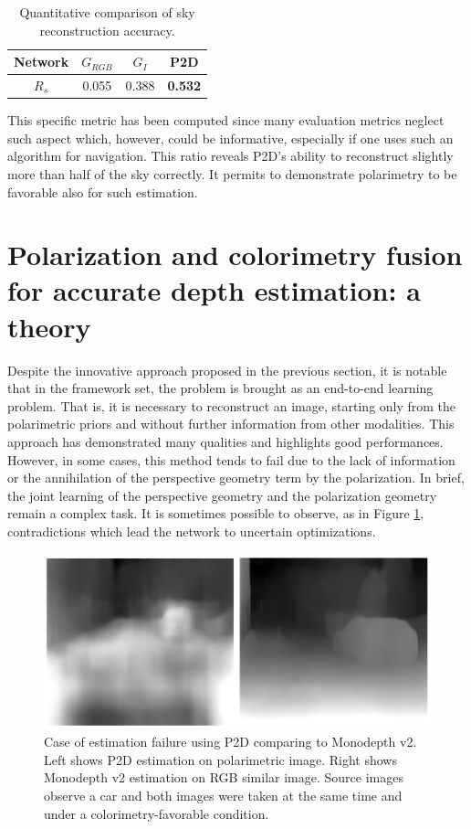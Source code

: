 \begin{center}
	\begin{table}[H]
		\centering
		\caption{Quantitative comparison of sky reconstruction accuracy.}
		\label{Reconsky}
		\begin{tabular}{c||ccc}
			\hline
			Network & $G_{RGB}$ & $G_{I}$ & P2D   \\ \hline \hline
			$R_s$      & 0.055     & 0.388   & \textbf{0.532} \\ \hline
		\end{tabular}
	\end{table}
\end{center}
This specific metric has been computed since many evaluation metrics neglect such aspect which, however, could be informative, especially if one uses such an algorithm for navigation. This ratio reveals P2D's ability to reconstruct slightly more than half of the sky correctly. It permits to demonstrate polarimetry to be favorable also for such estimation.


\section{Polarization and colorimetry fusion for accurate depth estimation: a theory}

Despite the innovative approach proposed in the previous section, it is notable that in the framework set, the problem is brought as an end-to-end learning problem.
That is, it is necessary to reconstruct an image, starting only from the polarimetric priors and without further information from other modalities.
This approach has demonstrated many qualities and highlights good performances. However, in some cases, this method tends to fail due to the lack of information or the annihilation of the perspective geometry term by the polarization.
In brief, the joint learning of the perspective geometry and the polarization geometry remain a complex task. It is sometimes possible to observe, as in Figure \ref{fig:polafail}, contradictions which lead the network to uncertain optimizations.

\begin{figure}[h]
	\centering
	\includegraphics[width=0.8\linewidth]{Figures/Fusion/polafail}
	\caption[Case of estimation failure using P2D comparing to Monodepth v2.]{Case of estimation failure using P2D comparing to Monodepth v2. Left shows P2D estimation on polarimetric image. Right shows Monodepth v2 estimation on RGB similar image. Source images observe a car and both images were taken at the same time and under a colorimetry-favorable condition.}
	\label{fig:polafail}
\end{figure}



